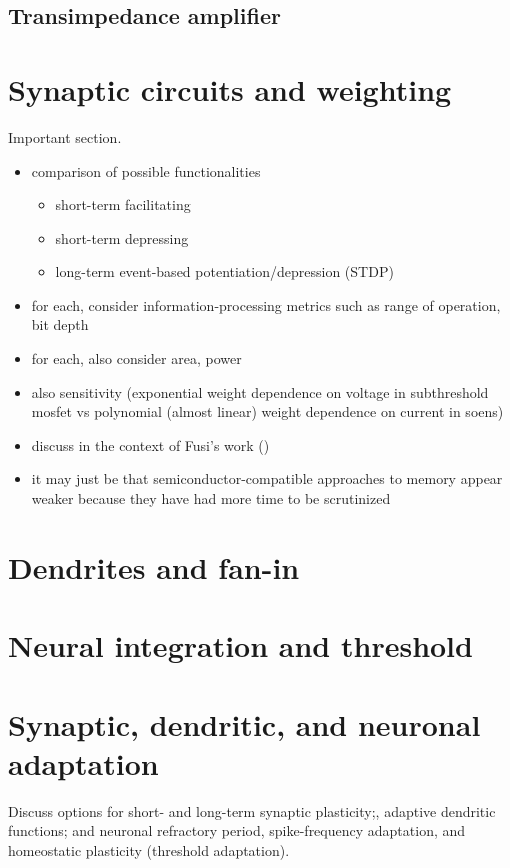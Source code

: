 \documentclass[onecolumn]{article}
\begin{document}
\subsection{Transimpedance amplifier}

\section{\label{sec:synapses}Synaptic circuits and weighting}
Important section.
\begin{itemize}
\item comparison of possible functionalities
\begin{itemize}
\item short-term facilitating
\item short-term depressing
\item long-term event-based potentiation/depression (STDP)
\end{itemize}
\item for each, consider information-processing metrics such as range of operation, bit depth 
\item for each, also consider area, power
\item also sensitivity (exponential weight dependence on voltage in subthreshold mosfet vs polynomial (almost linear) weight dependence on current in soens)
\item discuss in the context of Fusi's work (\cite{amfu1994,fudr2005,fuab2007})
\item it may just be that semiconductor-compatible approaches to memory appear weaker because they have had more time to be scrutinized
\end{itemize}

\section{\label{sec:dendrites}Dendrites and fan-in}

\section{\label{sec:neurons}Neural integration and threshold}

\section{\label{sec:adaptation}Synaptic, dendritic, and neuronal adaptation}
Discuss options for short- and long-term synaptic plasticity;, adaptive dendritic functions; and neuronal refractory period, spike-frequency adaptation, and homeostatic plasticity (threshold adaptation).
\end{document}
